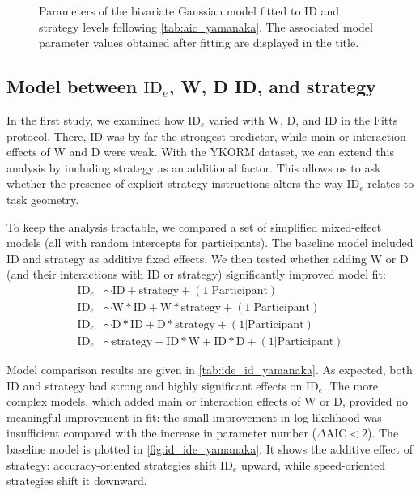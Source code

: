 \documentclass[acmlarge, manuscript,review]{acmart}
\newcommand{\ide}{\ensuremath{{\text{ID}_e}}\xspace}
\newcommand{\D}{\ensuremath{{\text{D}}}\xspace}
\newcommand{\W}{\ensuremath{{\text{W}}}\xspace}
\begin{document}
\begin{figure}[htbp]
	\centering
	\caption{Parameters of the bivariate Gaussian model fitted to ID and strategy levels following \autoref{tab:aic_yamanaka}. The associated model parameter values obtained after fitting are displayed in the title.}
	\label{fig:biv_strategy_fit_yamanaka}
\end{figure}


\subsection{Model between \ide, W, D ID, and strategy}
In the first study, we examined how \ide varied with W, D, and ID in the Fitts protocol. There, ID was by far the strongest predictor, while main or interaction effects of W and D were weak. With the YKORM dataset, we can extend this analysis by including strategy as an additional factor. This allows us to ask whether the presence of explicit strategy instructions alters the way \ide relates to task geometry.


To keep the analysis tractable, we compared a set of simplified mixed-effect models (all with random intercepts for participants). The baseline model included ID and strategy as additive fixed effects. We then tested whether adding W or D (and their interactions with ID or strategy) significantly improved model fit:
\begin{align}
		\ide & \sim  \text{ID} + \text{strategy} + (1|\text{Participant})\label{eq:ide_id_yamanaka_short} \\
		\ide & \sim \W*\text{ID} + \W*\text{strategy} + (1|\text{Participant})\label{eq:ide_id_yamanaka_W}\\
	\ide & \sim \D*\text{ID} + \D*\text{strategy} + (1|\text{Participant})\label{eq:ide_id_yamanaka_D}\\
\ide & \sim \text{strategy} + \text{ID}*\W + \text{ID}*\D + (1|\text{Participant}) \label{eq:ide_id_yamanaka_full} 
\end{align}

Model comparison results are given in \autoref{tab:ide_id_yamanaka}. As expected, both ID and strategy had strong and highly significant effects on \ide. The more complex models, which added main or interaction effects of W or D, provided no meaningful improvement in fit: the small improvement in log-likelihood was insufficient compared with the increase in parameter number ($\Delta \text{AIC} < 2$). 
The baseline model is plotted in \autoref{fig:id_ide_yamanaka}. It shows the additive effect of strategy: accuracy-oriented strategies shift \ide upward, while speed-oriented strategies shift it downward. 
\end{document}
